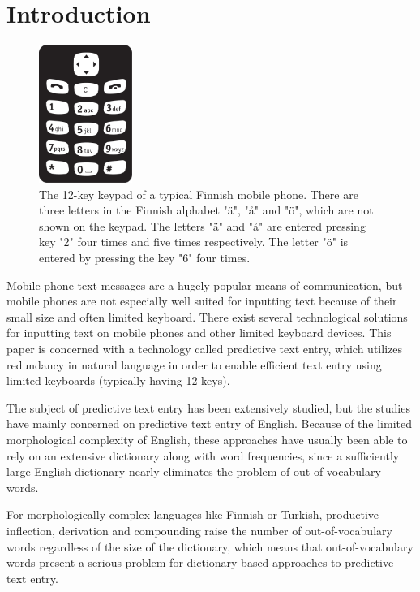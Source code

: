 \documentclass{llncs}
\begin{document}
\section{Introduction}

\begin{figure}[hbt!]
\begin{center}
\includegraphics[width=1.2in]{Nappaimet.pdf}
\caption{The 12-key keypad of a typical Finnish mobile phone. There are three letters in the Finnish alphabet "\"{a}", "å" and "\"{o}", which are not shown on the keypad. The
  letters "\"{a}" and "å" are entered pressing key "2" four times and
  five times respectively. The letter "\"{o}" is entered by pressing
  the key "6" four times.}\label{keypad}
\end{center}
\end{figure}

Mobile phone text messages are a hugely popular means of
communication, but mobile phones are not especially well suited for
inputting text because of their small size and often limited
keyboard. There exist several technological solutions for inputting text
on mobile phones and other limited keyboard devices. This paper is
concerned with a technology called predictive text entry, which
utilizes redundancy in natural language in order to enable efficient
text entry using limited keyboards (typically having 12 keys).



The subject of predictive text entry has been extensively studied, but
the studies have mainly concerned on predictive text entry of
English. Because of the limited morphological complexity of English,
these approaches have usually been able to rely on an extensive
dictionary along with word frequencies, since a sufficiently large
English dictionary nearly eliminates the problem of out-of-vocabulary
words. 

For morphologically complex languages like Finnish or Turkish,
productive inflection, derivation and compounding raise the number of
out-of-vocabulary words regardless of the size of the dictionary,
which means that out-of-vocabulary words present a serious problem for
dictionary based approaches to predictive text entry.
\end{document}
